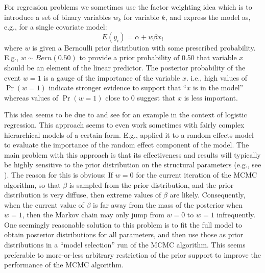 For regression problems we sometimes use the factor weighting idea
which is to introduce a set of binary variables $w_{k}$ for variable
$k$, and express the model as, e.g., for a single covariate model:
 \[
 E(y_i) = \alpha + w \beta x_{i}
\]
where $w$ is given a Bernoulli prior distribution with some prescribed
probability. E.g., $w \sim Bern(0.50)$ to provide a prior probability
of 0.50 that variable $x$ should be an element of the linear
predictor. The posterior probability of the event $w=1$ is a gauge of
the importance of the variable $x$. i.e., high values of $\Pr(w=1)$
indicate stronger evidence to support that ``$x$ is in the model''
whereas values of $\Pr(w=1)$ close to 0 suggest that $x$ is less
important.



This idea seems to be due to \citet{kuo_mallick:1998} and see
\citet[][Chapt. 3]{royle_dorazio:2008} for an example in the context
of logistic regression. This approach seems to even work sometimes
with fairly complex hierarchical models of a certain form. E.g.,
\citet{royle:2008} applied it to a random effects model to evaluate
the importance of the random effect component of the model.  The main
problem with this approach is that its effectiveness and results will
typically be highly sensitive to the prior distribution on the
structural parameters (e.g., see \citet[][table xyz]{royle_dorazio:2008}).
The reason for this is obvious: If $w = 0$ for the current
iteration of the MCMC algorithm, so that $\beta$ is sampled from the
prior distribution, and the prior distribution is very diffuse, then
extreme values of $\beta$ are likely. Consequently, when the current value of
$\beta$ is
far away from the mass of the posterior when $w=1$, then the Markov
chain may only jump from $w=0$ to $w=1$ infrequently.  One seemingly
reasonable solution to this problem \citep{aitkin:1991}
is to fit the full
model to obtain posterior distributions for all parameters, and then
use those as prior distributions in a ``model selection'' run of the
MCMC algorithm.  This seems preferable to more-or-less arbitrary restriction of
the prior support to improve the performance of the MCMC algorithm.

